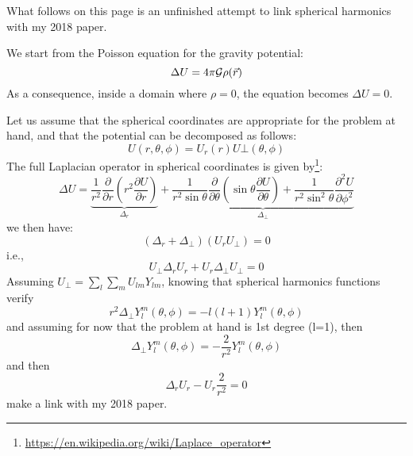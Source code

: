 







What follows on this page is an unfinished attempt to link spherical harmonics with 
my 2018 paper. 

We start from the Poisson equation for the gravity potential:
\begin{equation}
\Delta U = 4\pi {\cal G} \rho(\vec{r})
\end{equation}
As a consequence, inside a domain where $\rho=0$, the equation becomes $\Delta U=0$.

Let us assume that the spherical coordinates are appropriate for the problem at hand, and that 
the potential can be decomposed as follows:
\[
U(r,\theta,\phi) = U_r(r) U\bot(\theta,\phi)
\]
The full Laplacian operator in spherical coordinates is given 
by\footnote{\url{https://en.wikipedia.org/wiki/Laplace_operator}}:
\[
\Delta U 
= 
\underbrace{\frac{1}{r^2} \frac{\partial }{\partial r}\left(r^2 \frac{\partial U}{\partial r}\right)}_{\Delta_r}
+
\underbrace{
\frac{1}{r^2 \sin\theta} \frac{\partial }{\partial \theta} \left(\sin\theta \frac{\partial U}{\partial \theta} \right) 
+
\frac{1}{r^2 \sin^2\theta} \frac{\partial^2 U }{\partial \phi^2}
}_{\Delta_\bot}
\]
we then have:
\[
(\Delta_r + \Delta_\bot)(U_r U_\bot)=0
\]
i.e., 
\[
U_\bot \Delta_r U_r + U_r \Delta_\bot U_\bot=0
\]
Assuming $U_\bot=\sum_l\sum_m U_{lm}Y_{lm}$, knowing that spherical 
harmonics functions verify
\[
r^2 \Delta_\bot Y_l^m(\theta,\phi) = -l(l+1) Y_l^m (\theta,\phi)
\]
and assuming for now that the problem at hand is 1st degree (l=1), then 
\[
\Delta_\bot Y_l^m(\theta,\phi) = -\frac{2}{r^2} Y_l^m (\theta,\phi)
\]
and then
\[
\Delta_r U_r - U_r \frac{2}{r^2}=0
\]
make a link with my 2018 paper. 






